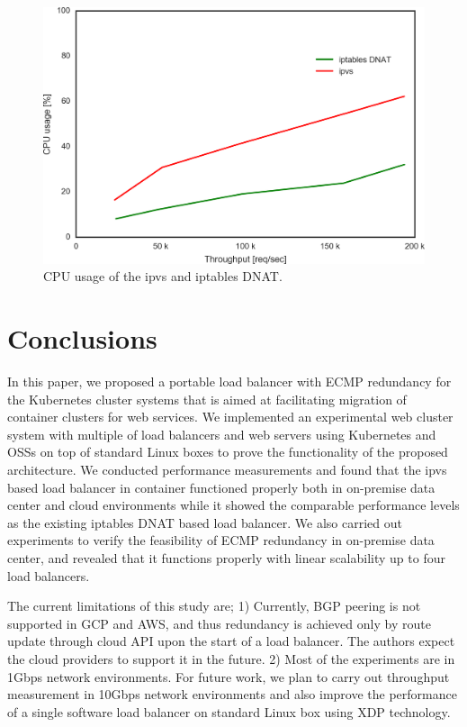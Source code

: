 \begin{figure}[h]
\includegraphics[width=\columnwidth]{Figs/cpu_usage}
\caption{CPU usage of the ipvs and iptables DNAT.}
\label{fig:cpu_usage}
\end{figure}

\section{Conclusions}\label{Conclusions}

In this paper, we proposed a portable load balancer with ECMP redundancy for the Kubernetes cluster systems that is aimed at facilitating migration of container clusters for web services.
We implemented an experimental web cluster system with multiple of load balancers and web servers using Kubernetes and OSSs on top of standard Linux boxes to prove the functionality of the proposed architecture.
We conducted performance measurements and found that the ipvs based load balancer in container functioned properly both in on-premise data center and cloud environments while it showed the comparable performance levels as the existing iptables DNAT based load balancer.
We also carried out experiments to verify the feasibility of ECMP redundancy in on-premise data center, and revealed that it functions properly with linear scalability up to four load balancers.

The current limitations of this study are;
1) Currently, BGP peering is not supported in GCP and AWS, and thus redundancy is achieved only by route update through cloud API upon the start of a load balancer.
The authors expect the cloud providers to support it in the future.
2) Most of the experiments are in 1Gbps network environments.
For future work, we plan to carry out throughput measurement in 10Gbps network environments and also improve the performance of a single software load balancer on standard Linux box using XDP technology.

